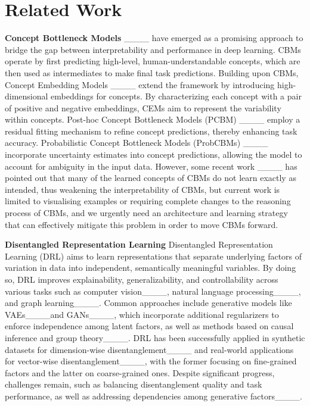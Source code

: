 \section{Related Work}
\textbf{Concept Bottleneck Models} ____ have emerged as a promising approach to bridge the gap between interpretability and performance in deep learning. CBMs operate by first predicting high-level, human-understandable concepts, which are then used as intermediates to make final task predictions. 
Building upon CBMs, Concept Embedding Models ____ extend the framework by introducing high-dimensional embeddings for concepts. By characterizing each concept with a pair of positive and negative embeddings, CEMs aim to represent the variability within concepts. Post-hoc Concept Bottleneck Models (PCBM) ____ employ a residual fitting mechanism to refine concept predictions, thereby enhancing task accuracy. Probabilistic Concept Bottleneck Models (ProbCBMs) ____ incorporate uncertainty estimates into concept predictions, allowing the model to account for ambiguity in the input data. However, some recent work ____ has pointed out that many of the learned concepts of CBMs do not learn exactly as intended, thus weakening the interpretability of CBMs, but current work is limited to visualising examples or requiring complete changes to the reasoning process of CBMs, and we urgently need an architecture and learning strategy that can effectively mitigate this problem in order to move CBMs forward.

\textbf{Disentangled Representation Learning} Disentangled Representation Learning (DRL) aims to learn representations that separate underlying factors of variation in data into independent, semantically meaningful variables. By doing so, DRL improves explainability, generalizability, and controllability across various tasks such as computer vision____, natural language processing____, and graph learning____. Common approaches include generative models like VAEs____and GANs____, which incorporate additional regularizers to enforce independence among latent factors, as well as methods based on causal inference and group theory____. DRL has been successfully applied in synthetic datasets for dimension-wise disentanglement____ and real-world applications for vector-wise disentanglement____, with the former focusing on fine-grained factors and the latter on coarse-grained ones. Despite significant progress, challenges remain, such as balancing disentanglement quality and task performance, as well as addressing dependencies among generative factors____.